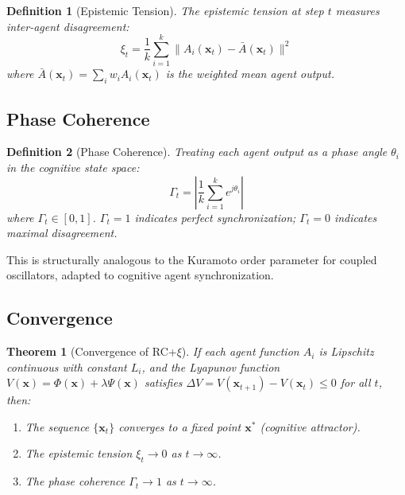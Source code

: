 \documentclass[11pt,a4paper]{article}
\newtheorem{definition}{Definition}
\newtheorem{theorem}{Theorem}
\begin{document}
\begin{definition}[Epistemic Tension]
The epistemic tension at step $t$ measures inter-agent disagreement:
\begin{equation}
\label{eq:tension}
\xi_t = \frac{1}{k} \sum_{i=1}^{k} \| A_i(\mathbf{x}_t) - \bar{A}(\mathbf{x}_t) \|^2
\end{equation}
where $\bar{A}(\mathbf{x}_t) = \sum_{i} w_i A_i(\mathbf{x}_t)$ is the weighted mean agent output.
\end{definition}

\subsection{Phase Coherence}

\begin{definition}[Phase Coherence]
Treating each agent output as a phase angle $\theta_i$ in the cognitive state space:
\begin{equation}
\label{eq:coherence}
\Gamma_t = \left| \frac{1}{k} \sum_{i=1}^{k} e^{j\theta_i} \right|
\end{equation}
where $\Gamma_t \in [0,1]$. $\Gamma_t = 1$ indicates perfect synchronization; $\Gamma_t = 0$ indicates maximal disagreement.
\end{definition}

This is structurally analogous to the Kuramoto order parameter for coupled oscillators, adapted to cognitive agent synchronization.

\subsection{Convergence}

\begin{theorem}[Convergence of RC+$\xi$]
\label{thm:convergence}
If each agent function $A_i$ is Lipschitz continuous with constant $L_i$, and the Lyapunov function $V(\mathbf{x}) = \Phi(\mathbf{x}) + \lambda\Psi(\mathbf{x})$ satisfies $\Delta V = V(\mathbf{x}_{t+1}) - V(\mathbf{x}_t) \leq 0$ for all $t$, then:
\begin{enumerate}[nosep]
  \item The sequence $\{\mathbf{x}_t\}$ converges to a fixed point $\mathbf{x}^*$ (cognitive attractor).
  \item The epistemic tension $\xi_t \to 0$ as $t \to \infty$.
  \item The phase coherence $\Gamma_t \to 1$ as $t \to \infty$.
\end{enumerate}
\end{theorem}
\end{document}

